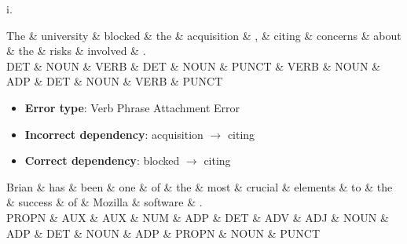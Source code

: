i. \\
\begin{center}
{

\begin{dependency}[] 
 \begin{deptext}
The \& university \& blocked \& the \& acquisition \& , \& citing \& concerns \& about \& the \& risks \& involved \& . \\
DET \& NOUN \& VERB \& DET \& NOUN \& PUNCT \& VERB \& NOUN \& ADP \& DET \& NOUN \& VERB \& PUNCT \\
\end{deptext}
\end{dependency}
 }
 \end{center}

{\color{red}
\begin{itemize}
    \item \textbf{Error type}: Verb Phrase Attachment Error
    \item \textbf{Incorrect dependency}: acquisition $\rightarrow$ citing
    \item \textbf{Correct dependency}: blocked $\rightarrow$ citing
\end{itemize}
}
 \begin{center}
 \color{black}
 {\small
 \begin{dependency}
 \begin{deptext}
 Brian \& has \& been \& one \& of  \& the \& most \& crucial \& elements \& to  \& the \& success \& of  \& Mozilla \& software \& .     \\
 PROPN \& AUX \& AUX  \& NUM \& ADP \& DET \& ADV  \& ADJ     \& NOUN     \& ADP \& DET \& NOUN    \& ADP \& PROPN   \& NOUN \& PUNCT \\
 \end{deptext}
 \end{dependency}
 }
 \end{center}

